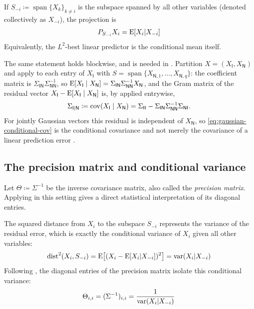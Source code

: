 \documentclass{IEEEtran}
\begin{document}
If $S_{-i} \coloneq \operatorname{span}\{X_{k}\}_{k \neq i}$ is the subspace spanned by all other variables (denoted collectively as $X_{- i}$), the projection is
\begin{equation*}
  P_{S_{-i}} X_{i} = \operatorname{E}[X_{i} | X_{- i}]
\end{equation*}
Equivalently, the $L^{2}$-best linear predictor is the conditional mean itself.

The same statement holds blockwise, and is needed in . Partition $X = (X_{\mathsf{I}}, X_{\mathsf{N}})$ and apply  to each entry of $X_{\mathsf{I}}$ with $S = \operatorname{span}\{X_{\mathsf{N},1},\ldots,X_{\mathsf{N},q}\}$: the coefficient matrix is $\Sigma_{\mathsf{IN}}\Sigma_{\mathsf{NN}}^{-1}$, so $\operatorname{E}[X_{\mathsf{I}}\mid X_{\mathsf{N}}] = \Sigma_{\mathsf{IN}}\Sigma_{\mathsf{NN}}^{-1}X_{\mathsf{N}}$, and the Gram matrix of the residual vector $X_{\mathsf{I}} - \operatorname{E}[X_{\mathsf{I}}\mid X_{\mathsf{N}}]$ is, by
 applied entrywise,
\begin{equation}
  \Sigma_{\mathsf{I}\mid\mathsf{N}}
  \coloneq \operatorname{cov}(X_{\mathsf{I}}\mid X_{\mathsf{N}})
  = \Sigma_{\mathsf{II}} - \Sigma_{\mathsf{IN}}\Sigma_{\mathsf{NN}}^{-1}\Sigma_{\mathsf{NI}} .
  \label{eq:gaussian-conditional-cov}
\end{equation}
For jointly Gaussian vectors this residual is independent of $X_{\mathsf{N}}$, so \eqref{eq:gaussian-conditional-cov} is the conditional covariance and not merely the covariance of a linear prediction error \cite[Ch.~2]{anderson2003}.

\subsection{The precision matrix and conditional variance}

Let $\Theta \coloneq \Sigma^{-1}$ be the inverse covariance matrix, also called the \emph{precision matrix}. Applying  in this setting gives a direct statistical interpretation of its diagonal entries.

\begin{corollary}
  \label{cor:precision-diag}
  The squared distance from $X_{i}$ to the subspace $S_{-i}$ represents the variance of the residual error, which is exactly the conditional variance of $X_{i}$ given all other variables:
  \begin{equation*}
    \operatorname{dist}^{2}(X_{i}, S_{-i})
    = \operatorname{E}\bigl[(X_{i} - \operatorname{E}[X_{i} | X_{- i}])^{2}\bigr]
    = \operatorname{var}(X_{i} | X_{- i})
  \end{equation*}
  Following , the diagonal entries of the precision matrix isolate this conditional variance:
  \begin{equation}
    \Theta_{i,i} = (\Sigma^{-1})_{i,i} = \frac{1}{\operatorname{var}(X_{i} | X_{- i})}
    \label{eq:precision-diag}
  \end{equation}
\end{corollary}
\end{document}
